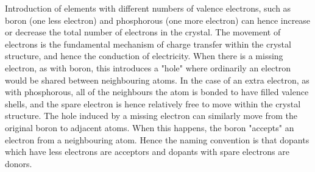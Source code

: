 \begin{refsection}
Introduction of elements with different numbers of valence electrons, such as boron (one less electron) and phosphorous (one more electron) can hence increase or decrease the total number of electrons in the crystal. The movement of electrons is the fundamental mechanism of charge transfer within the crystal structure, and hence the conduction of electricity. When there is a missing electron, as with boron, this introduces a "hole" where ordinarily an electron would be shared between neighbouring atoms. In the case of an extra electron, as with phosphorous, all of the neighbours the atom is bonded to have filled valence shells, and the spare electron is hence relatively free to move within the crystal structure. The hole induced by a missing electron can similarly move from the original boron to adjacent atoms. When this happens, the boron "accepts" an electron from a neighbouring atom. Hence the naming convention is that dopants which have less electrons are acceptors and dopants with spare electrons are donors.

\end{refsection}

